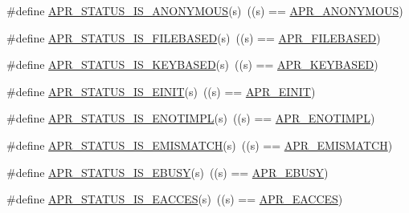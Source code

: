 \begin{DoxyCompactItemize}
\item 
\#define \mbox{\hyperlink{group___a_p_r___s_t_a_t_u_s___i_s_gabf2969f69ac131cb06178c0809abf943}{A\+P\+R\+\_\+\+S\+T\+A\+T\+U\+S\+\_\+\+I\+S\+\_\+\+A\+N\+O\+N\+Y\+M\+O\+US}}(s)~((s) == \mbox{\hyperlink{group___a_p_r___error_ga738a229b0c27bd96ae0173fecab251b7}{A\+P\+R\+\_\+\+A\+N\+O\+N\+Y\+M\+O\+US}})
\item 
\#define \mbox{\hyperlink{group___a_p_r___s_t_a_t_u_s___i_s_ga7e46240d526e81f5ffbc266ca29b9f6a}{A\+P\+R\+\_\+\+S\+T\+A\+T\+U\+S\+\_\+\+I\+S\+\_\+\+F\+I\+L\+E\+B\+A\+S\+ED}}(s)~((s) == \mbox{\hyperlink{group___a_p_r___error_ga28a6d59b62d2698208451a9343399fbb}{A\+P\+R\+\_\+\+F\+I\+L\+E\+B\+A\+S\+ED}})
\item 
\#define \mbox{\hyperlink{group___a_p_r___s_t_a_t_u_s___i_s_gaf43f4a40f5ab2fe196acb4e12f20b79e}{A\+P\+R\+\_\+\+S\+T\+A\+T\+U\+S\+\_\+\+I\+S\+\_\+\+K\+E\+Y\+B\+A\+S\+ED}}(s)~((s) == \mbox{\hyperlink{group___a_p_r___error_gaac52bebace264494fa94cdf0b4344d26}{A\+P\+R\+\_\+\+K\+E\+Y\+B\+A\+S\+ED}})
\item 
\#define \mbox{\hyperlink{group___a_p_r___s_t_a_t_u_s___i_s_gaeaa5fbb21b72fcbbe98b0f100d204048}{A\+P\+R\+\_\+\+S\+T\+A\+T\+U\+S\+\_\+\+I\+S\+\_\+\+E\+I\+N\+IT}}(s)~((s) == \mbox{\hyperlink{group___a_p_r___error_gaacd087793c97a3493eafc14075775b82}{A\+P\+R\+\_\+\+E\+I\+N\+IT}})
\item 
\#define \mbox{\hyperlink{group___a_p_r___s_t_a_t_u_s___i_s_gacab882e24f5d6491777e8ef7763d02fb}{A\+P\+R\+\_\+\+S\+T\+A\+T\+U\+S\+\_\+\+I\+S\+\_\+\+E\+N\+O\+T\+I\+M\+PL}}(s)~((s) == \mbox{\hyperlink{group___a_p_r___error_ga939ddb834a30bc9a5a0a329b13000161}{A\+P\+R\+\_\+\+E\+N\+O\+T\+I\+M\+PL}})
\item 
\#define \mbox{\hyperlink{group___a_p_r___s_t_a_t_u_s___i_s_ga7234b0d01a8e3ea8e5345f3f242df030}{A\+P\+R\+\_\+\+S\+T\+A\+T\+U\+S\+\_\+\+I\+S\+\_\+\+E\+M\+I\+S\+M\+A\+T\+CH}}(s)~((s) == \mbox{\hyperlink{group___a_p_r___error_ga31e65a44daba96aa6d943529e94498e7}{A\+P\+R\+\_\+\+E\+M\+I\+S\+M\+A\+T\+CH}})
\item 
\#define \mbox{\hyperlink{group___a_p_r___s_t_a_t_u_s___i_s_gabb92ad7b6ef304132de70e9e5cbaa896}{A\+P\+R\+\_\+\+S\+T\+A\+T\+U\+S\+\_\+\+I\+S\+\_\+\+E\+B\+U\+SY}}(s)~((s) == \mbox{\hyperlink{group___a_p_r___error_gab6e5bc99dbace4a91d8d0adcbd8fd66b}{A\+P\+R\+\_\+\+E\+B\+U\+SY}})
\item 
\#define \mbox{\hyperlink{group___a_p_r___s_t_a_t_u_s___i_s_ga61e7a9958689dec6da6279f0cb6073ca}{A\+P\+R\+\_\+\+S\+T\+A\+T\+U\+S\+\_\+\+I\+S\+\_\+\+E\+A\+C\+C\+ES}}(s)~((s) == \mbox{\hyperlink{group___a_p_r___error_ga407fc0ea7ead60f7a97fb9d70061bd41}{A\+P\+R\+\_\+\+E\+A\+C\+C\+ES}})

\end{DoxyCompactItemize}
